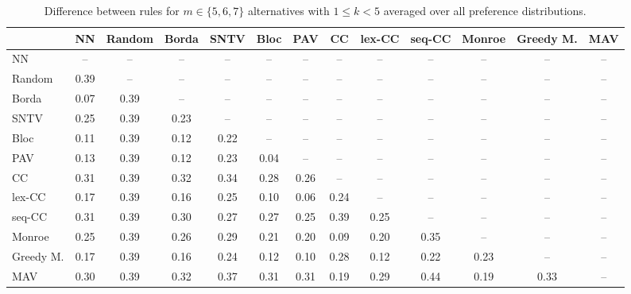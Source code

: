 
\begin{table*}[htbp]
\centering
\begin{tabular}{lcccccccccccc}
\toprule
 & NN & Random & Borda & SNTV & Bloc & PAV & CC & lex-CC & seq-CC & Monroe & Greedy M. & MAV \\
\midrule
NN & -- & -- & -- & -- & -- & -- & -- & -- & -- & -- & -- & -- \\
Random & \cellcolor{blue!39} 0.39 & -- & -- & -- & -- & -- & -- & -- & -- & -- & -- & -- \\
Borda & \cellcolor{blue!7} 0.07 & \cellcolor{blue!39} 0.39 & -- & -- & -- & -- & -- & -- & -- & -- & -- & -- \\
SNTV & \cellcolor{blue!25} 0.25 & \cellcolor{blue!39} 0.39 & \cellcolor{blue!23} 0.23 & -- & -- & -- & -- & -- & -- & -- & -- & -- \\
Bloc & \cellcolor{blue!11} 0.11 & \cellcolor{blue!39} 0.39 & \cellcolor{blue!12} 0.12 & \cellcolor{blue!22} 0.22 & -- & -- & -- & -- & -- & -- & -- & -- \\
PAV & \cellcolor{blue!13} 0.13 & \cellcolor{blue!39} 0.39 & \cellcolor{blue!12} 0.12 & \cellcolor{blue!23} 0.23 & \cellcolor{blue!4} 0.04 & -- & -- & -- & -- & -- & -- & -- \\
CC & \cellcolor{blue!31} 0.31 & \cellcolor{blue!39} 0.39 & \cellcolor{blue!32} 0.32 & \cellcolor{blue!34} 0.34 & \cellcolor{blue!28} 0.28 & \cellcolor{blue!26} 0.26 & -- & -- & -- & -- & -- & -- \\
lex-CC & \cellcolor{blue!17} 0.17 & \cellcolor{blue!39} 0.39 & \cellcolor{blue!16} 0.16 & \cellcolor{blue!25} 0.25 & \cellcolor{blue!10} 0.10 & \cellcolor{blue!6} 0.06 & \cellcolor{blue!24} 0.24 & -- & -- & -- & -- & -- \\
seq-CC & \cellcolor{blue!31} 0.31 & \cellcolor{blue!39} 0.39 & \cellcolor{blue!30} 0.30 & \cellcolor{blue!27} 0.27 & \cellcolor{blue!27} 0.27 & \cellcolor{blue!25} 0.25 & \cellcolor{blue!39} 0.39 & \cellcolor{blue!25} 0.25 & -- & -- & -- & -- \\
Monroe & \cellcolor{blue!25} 0.25 & \cellcolor{blue!39} 0.39 & \cellcolor{blue!26} 0.26 & \cellcolor{blue!28} 0.29 & \cellcolor{blue!21} 0.21 & \cellcolor{blue!20} 0.20 & \cellcolor{blue!9} 0.09 & \cellcolor{blue!20} 0.20 & \cellcolor{blue!35} 0.35 & -- & -- & -- \\
Greedy M. & \cellcolor{blue!17} 0.17 & \cellcolor{blue!39} 0.39 & \cellcolor{blue!16} 0.16 & \cellcolor{blue!24} 0.24 & \cellcolor{blue!12} 0.12 & \cellcolor{blue!10} 0.10 & \cellcolor{blue!28} 0.28 & \cellcolor{blue!12} 0.12 & \cellcolor{blue!22} 0.22 & \cellcolor{blue!23} 0.23 & -- & -- \\
MAV & \cellcolor{blue!30} 0.30 & \cellcolor{blue!39} 0.39 & \cellcolor{blue!32} 0.32 & \cellcolor{blue!37} 0.37 & \cellcolor{blue!31} 0.31 & \cellcolor{blue!31} 0.31 & \cellcolor{blue!19} 0.19 & \cellcolor{blue!28} 0.29 & \cellcolor{blue!44} 0.44 & \cellcolor{blue!19} 0.19 & \cellcolor{blue!33} 0.33 & -- \\
\bottomrule
\end{tabular}

\caption{Difference between rules for $m \in \{5, 6, 7\}$ alternatives with $1 \leq k < 5$ averaged over all preference distributions.}
\label{tab:rule_distance_heatmap-m=[5, 6, 7]-pref_dist=all}
\end{table*}
    